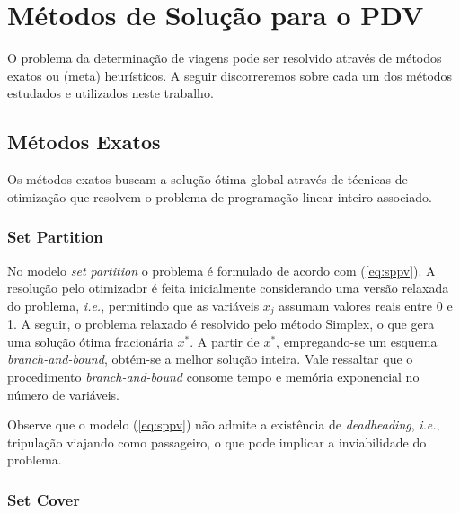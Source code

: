\documentclass[12pt,a4paper]{article}
\newcommand{\ie}{\emph{i.e.}}                                %
\newcommand{\zerar}{\setcounter{equation}{0}\setcounter{figure}{0}\setcounter{table}{0}}
\begin{document}
\zerar
\section{Métodos de Solução para o PDV}
\label{sec:metodos}

O problema da determinação de viagens pode ser resolvido através de métodos exatos ou (meta)
heurísticos. A seguir discorreremos sobre cada um dos métodos estudados e utilizados neste trabalho.


\subsection{Métodos Exatos}
\label{sec:metodos_exatos}

Os métodos exatos buscam a solução ótima global através de técnicas de otimização que resolvem o
problema de programação linear inteiro associado.


\subsubsection{Set Partition}
\label{sec:metodos_partition}

No modelo {\it set partition} o problema é formulado de acordo com (\ref{eq:sppv}). A resolução pelo
otimizador é feita inicialmente considerando uma versão relaxada do problema, \ie, permitindo que as
variáveis $x_j$ assumam valores reais entre 0 e 1. A seguir, o problema relaxado é resolvido pelo
método Simplex, o que gera uma solução ótima fracionária $x^\ast$. A partir de $x^\ast$,
empregando-se um esquema {\it branch-and-bound}, obtém-se a melhor solução inteira. Vale ressaltar
que o procedimento {\it branch-and-bound} consome tempo e memória exponencial no número de
variáveis.

Observe que o modelo (\ref{eq:sppv}) não admite a existência de {\it deadheading}, \ie, tripulação 
viajando como passageiro, o que pode implicar a inviabilidade do problema.


\subsubsection{Set Cover}
\label{sec:metodos_cover}
\end{document}
